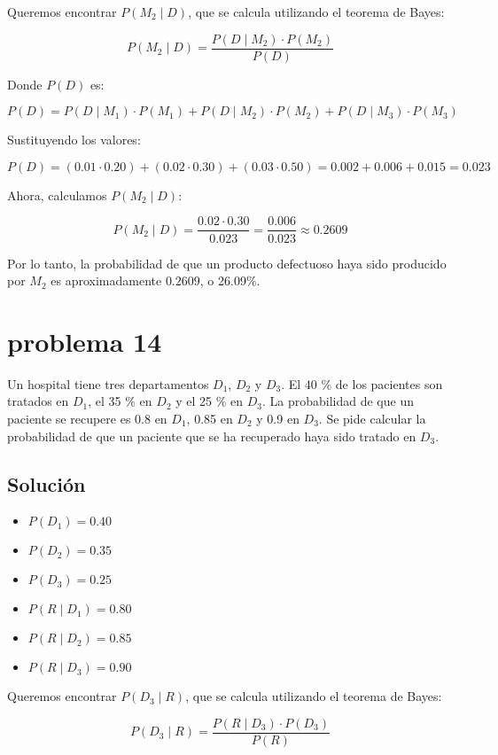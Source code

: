 \documentclass[12pt,a4paper]{article}
\begin{document}
Queremos encontrar \( P(M_2 \mid D) \), que se calcula utilizando el teorema de Bayes:

\[
P(M_2 \mid D) = \frac{P(D \mid M_2) \cdot P(M_2)}{P(D)}
\]

Donde \( P(D) \) es:

\[
P(D) = P(D \mid M_1) \cdot P(M_1) + P(D \mid M_2) \cdot P(M_2) + P(D \mid M_3) \cdot P(M_3)
\]

Sustituyendo los valores:

\[
P(D) = (0.01 \cdot 0.20) + (0.02 \cdot 0.30) + (0.03 \cdot 0.50) = 0.002 + 0.006 + 0.015 = 0.023
\]

Ahora, calculamos \( P(M_2 \mid D) \):

\[
P(M_2 \mid D) = \frac{0.02 \cdot 0.30}{0.023} = \frac{0.006}{0.023} \approx 0.2609
\]

Por lo tanto, la probabilidad de que un producto defectuoso haya sido producido por \( M_2 \) es aproximadamente \( 0.2609 \), o 26.09\%.

\newpage 
\section*{problema 14}
Un hospital tiene tres departamentos \( D_1 \), \( D_2 \) y \( D_3 \). El 40 \% de los pacientes son tratados en \( D_1 \), el 35 \% en \( D_2 \) y el 25 \% en \( D_3 \). La probabilidad de que un paciente se recupere es 0.8 en \( D_1 \), 0.85 en \( D_2 \) y 0.9 en \( D_3 \). Se pide calcular la probabilidad de que un paciente que se ha recuperado haya sido tratado en \( D_3 \).

\subsection*{Solución}

\begin{itemize}
    \item \( P(D_1) = 0.40 \)
    \item \( P(D_2) = 0.35 \)
    \item \( P(D_3) = 0.25 \)
    \item \( P(R \mid D_1) = 0.80 \)
    \item \( P(R \mid D_2) = 0.85 \)
    \item \( P(R \mid D_3) = 0.90 \)
\end{itemize}

Queremos encontrar \( P(D_3 \mid R) \), que se calcula utilizando el teorema de Bayes:

\[
P(D_3 \mid R) = \frac{P(R \mid D_3) \cdot P(D_3)}{P(R)}
\]
\end{document}

